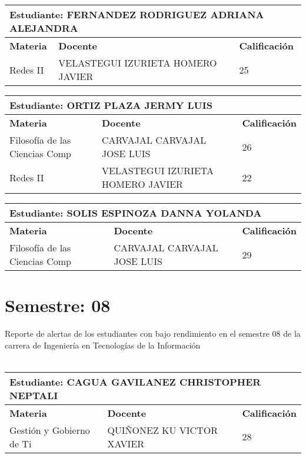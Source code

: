 \small
\begin{tabularx}{\textwidth}{|p{5cm}|p{7cm}|X|}
\hline
\multicolumn{3}{|p{\dimexpr\textwidth-2\tabcolsep-2\arrayrulewidth}|}{\textbf{Estudiante: FERNANDEZ RODRIGUEZ ADRIANA ALEJANDRA }}\\\hline
\textbf{Materia} & \textbf{Docente} & \textbf{Calificación} \\ \hline
Redes II & VELASTEGUI IZURIETA HOMERO JAVIER  & 25 \\ \hline
\end{tabularx}\vspace{10mm}
\small
\begin{tabularx}{\textwidth}{|p{5cm}|p{7cm}|X|}
\hline
\multicolumn{3}{|p{\dimexpr\textwidth-2\tabcolsep-2\arrayrulewidth}|}{\textbf{Estudiante: ORTIZ PLAZA JERMY LUIS }}\\\hline
\textbf{Materia} & \textbf{Docente} & \textbf{Calificación} \\ \hline
Filosofía de las Ciencias Comp & CARVAJAL CARVAJAL JOSE LUIS  & 26 \\ \hline
Redes II & VELASTEGUI IZURIETA HOMERO JAVIER  & 22 \\ \hline
\end{tabularx}\vspace{10mm}
\small
\begin{tabularx}{\textwidth}{|p{5cm}|p{7cm}|X|}
\hline
\multicolumn{3}{|p{\dimexpr\textwidth-2\tabcolsep-2\arrayrulewidth}|}{\textbf{Estudiante: SOLIS ESPINOZA DANNA YOLANDA }}\\\hline
\textbf{Materia} & \textbf{Docente} & \textbf{Calificación} \\ \hline
Filosofía de las Ciencias Comp & CARVAJAL CARVAJAL JOSE LUIS  & 29 \\ \hline
\end{tabularx}\vspace{10mm}
\section{Semestre: 08}
        Reporte de alertas de los estudiantes con bajo rendimiento en el semestre 08 de la carrera de 
        Ingeniería en Tecnologías de la Información\\\\\small
\begin{tabularx}{\textwidth}{|p{5cm}|p{7cm}|X|}
\hline
\multicolumn{3}{|p{\dimexpr\textwidth-2\tabcolsep-2\arrayrulewidth}|}{\textbf{Estudiante: CAGUA GAVILANEZ CHRISTOPHER NEPTALI }}\\\hline
\textbf{Materia} & \textbf{Docente} & \textbf{Calificación} \\ \hline
Gestión y Gobierno de Ti & QUIÑONEZ KU VICTOR XAVIER  & 28 \\ \hline
\end{tabularx}\vspace{10mm}
